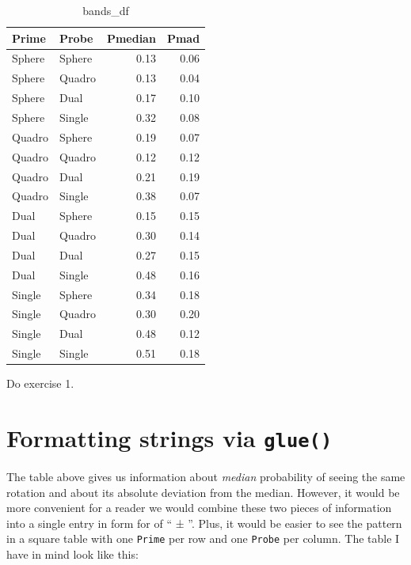 \documentclass[
]{book}
\begin{document}
\begin{table}

\caption{\label{tab:unnamed-chunk-294}bands\_df}
\centering
\begin{tabular}[t]{l|l|r|r}
\hline
Prime & Probe & Pmedian & Pmad\\
\hline
Sphere & Sphere & 0.13 & 0.06\\
\hline
Sphere & Quadro & 0.13 & 0.04\\
\hline
Sphere & Dual & 0.17 & 0.10\\
\hline
Sphere & Single & 0.32 & 0.08\\
\hline
Quadro & Sphere & 0.19 & 0.07\\
\hline
Quadro & Quadro & 0.12 & 0.12\\
\hline
Quadro & Dual & 0.21 & 0.19\\
\hline
Quadro & Single & 0.38 & 0.07\\
\hline
Dual & Sphere & 0.15 & 0.15\\
\hline
Dual & Quadro & 0.30 & 0.14\\
\hline
Dual & Dual & 0.27 & 0.15\\
\hline
Dual & Single & 0.48 & 0.16\\
\hline
Single & Sphere & 0.34 & 0.18\\
\hline
Single & Quadro & 0.30 & 0.20\\
\hline
Single & Dual & 0.48 & 0.12\\
\hline
Single & Single & 0.51 & 0.18\\
\hline
\end{tabular}
\end{table}

Do exercise 1.

\hypertarget{glue}{%
\section{\texorpdfstring{Formatting strings via \texttt{glue()}}{Formatting strings via glue()}}\label{glue}}

The table above gives us information about \emph{median} probability of seeing the same rotation and about its absolute deviation from the median. However, it would be more convenient for a reader we would combine these two pieces of information into a single entry in form for of `` ± ''. Plus, it would be easier to see the pattern in a square table with one \texttt{Prime} per row and one \texttt{Probe} per column. The table I have in mind look like this:
\end{document}
